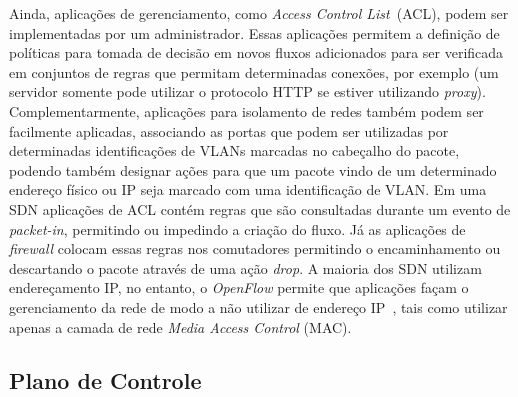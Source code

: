 Ainda, aplicações de gerenciamento, como \textit{Access Control List}~(ACL), podem ser implementadas por um administrador.
Essas aplicações permitem a definição de políticas para tomada de decisão em novos fluxos adicionados para ser verificada em conjuntos de regras que permitam determinadas conexões, por exemplo (um servidor somente pode utilizar o protocolo HTTP se estiver utilizando \textit{proxy}). 
Complementarmente, aplicações para isolamento de redes também podem ser facilmente aplicadas, associando as portas que podem ser utilizadas por determinadas identificações de VLANs marcadas no cabeçalho do pacote, podendo também designar ações para que um pacote vindo de um determinado endereço físico ou IP seja marcado com uma identificação de VLAN. Em uma SDN aplicações de ACL contém regras que são consultadas durante um evento de \textit{packet-in}, permitindo ou impedindo a criação do fluxo. Já as aplicações de \textit{firewall} colocam essas regras nos comutadores permitindo o encaminhamento ou descartando o pacote através de uma ação \textit{drop}.
A maioria dos SDN utilizam endereçamento IP, no entanto, o \textit{OpenFlow} permite que aplicações façam o gerenciamento da rede de modo a não utilizar de endereço IP~\cite{mckeown2008}, tais como utilizar apenas a camada de rede \emph{Media Access Control} (MAC).







\subsection{Plano de Controle}

